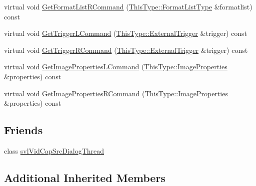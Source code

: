 \begin{DoxyCompactItemize}
\item 
virtual void \hyperlink{classsvl_filter_source_video_capture_a9e0816d82331d49ca668c520e0b6f08b}{Get\-Format\-List\-R\-Command} (\hyperlink{classsvl_filter_source_video_capture_af6d31bdf8807755322cd7e5ef1f0d8d9}{This\-Type\-::\-Format\-List\-Type} \&formatlist) const 
\item 
virtual void \hyperlink{classsvl_filter_source_video_capture_ae425165fad79636ee1c44dc67f10d6ed}{Get\-Trigger\-L\-Command} (\hyperlink{classsvl_filter_source_video_capture_a609a8eb75ea23b7b35068207cc3c3144}{This\-Type\-::\-External\-Trigger} \&trigger) const 
\item 
virtual void \hyperlink{classsvl_filter_source_video_capture_a0ad2bb0c7ecedf0cf3db911764c92257}{Get\-Trigger\-R\-Command} (\hyperlink{classsvl_filter_source_video_capture_a609a8eb75ea23b7b35068207cc3c3144}{This\-Type\-::\-External\-Trigger} \&trigger) const 
\item 
virtual void \hyperlink{classsvl_filter_source_video_capture_a29d406f7888ac42962c86edc507c7f98}{Get\-Image\-Properties\-L\-Command} (\hyperlink{classsvl_filter_source_video_capture_ad5d8ccc6a284be386d49b60574937f4d}{This\-Type\-::\-Image\-Properties} \&properties) const 
\item 
virtual void \hyperlink{classsvl_filter_source_video_capture_a5b1dd1a254e7425ce53539e909a49e53}{Get\-Image\-Properties\-R\-Command} (\hyperlink{classsvl_filter_source_video_capture_ad5d8ccc6a284be386d49b60574937f4d}{This\-Type\-::\-Image\-Properties} \&properties) const 
\end{DoxyCompactItemize}
\subsection*{Friends}
\begin{DoxyCompactItemize}
\item 
class \hyperlink{classsvl_filter_source_video_capture_aa65165c939d276c4378a32c5405f83d4}{svl\-Vid\-Cap\-Src\-Dialog\-Thread}
\end{DoxyCompactItemize}
\subsection*{Additional Inherited Members}


